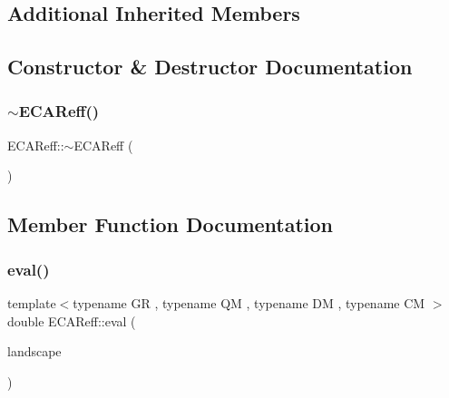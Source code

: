 \subsection*{Additional Inherited Members}


\subsection{Constructor \& Destructor Documentation}
\mbox{\label{class_e_c_a_reff_ae1a03ebc18f59b302e11cc3f88570562}} 
\subsubsection{\texorpdfstring{$\sim$\+E\+C\+A\+Reff()}{~ECAReff()}}
{\footnotesize\ttfamily E\+C\+A\+Reff\+::$\sim$\+E\+C\+A\+Reff (\begin{DoxyParamCaption}{ }\end{DoxyParamCaption})}



\subsection{Member Function Documentation}
\mbox{\label{class_e_c_a_reff_a6ae1382bfd570347211838b7fa34b7c7}} 
\subsubsection{\texorpdfstring{eval()}{eval()}}
{\footnotesize\ttfamily template$<$typename GR , typename QM , typename DM , typename CM $>$ \\
double E\+C\+A\+Reff\+::eval (\begin{DoxyParamCaption}\item[{const \hyperlink{classconcepts_1_1_abstract_landscape}{concepts\+::\+Abstract\+Landscape}$<$ GR, QM, DM, CM $>$ \&}]{landscape }\end{DoxyParamCaption})}

\mbox{\label{class_e_c_a_reff_af6d8a1284a194d55123e8a878127c45d}} 
